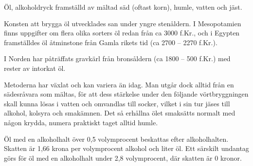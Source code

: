 \vspace{10pt}
\hspace{10pt}Öl, alkoholdryck framställd av mältad säd (oftast korn), humle, vatten
och jäst.\par
\vspace{10pt}
\hspace{10pt} Konsten att brygga öl utvecklades san under yngre
stenåldern. I Mesopotamien finns uppgifter om flera olika sorters öl
redan från ca 3000 f.Kr., och i Egypten framställdes öl åtminstone
från Gamla rikets tid (ca 2700 – 2270 f.Kr.).\par
\hspace{10pt} I Norden har påträffats gravkärl från bronsåldern
(ca 1800 – 500 f.Kr.) med rester av intorkat öl.\par
\hspace{10pt} Metoderna har växlat och kan variera än
idag. Man utgår dock alltid från en sädesråvara som mältas, för att
dess stärkelse under den följande vörtbryggningen skall kunna lösas i
vatten och omvandlas till socker, vilket i sin tur jäses till alkohol,
kolsyra och smakämnen. Det så erhållna ölet smaksätts normalt med
någon krydda, numera praktiskt taget alltid humle.\par
\hspace{10pt}Öl med en alkoholhalt över 0,5 volymprocent beskattas efter
alkoholhalten. Skatten är 1,66 krona per volymprocent alkohol och
liter öl. Ett särskilt undantag görs för öl med en alkoholhalt under
2,8 volymprocent, där skatten är 0 kronor.
